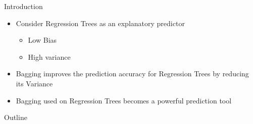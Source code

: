 \documentclass{beamer}
\begin{document}
\begin{frame}{Introduction}
\begin{itemize}
\item Consider Regression Trees as an explanatory predictor
	\begin{itemize}
	\item Low Bias %
    \item High variance %

	\end{itemize}
\item Bagging improves the prediction accuracy for Regression Trees by reducing its Variance
\item Bagging used on Regression Trees becomes a powerful prediction tool

\end{itemize}
%
%
%
%
%
\end{frame}


\begin{frame}{Outline}
  \tableofcontents
\end{frame}


\end{document}
